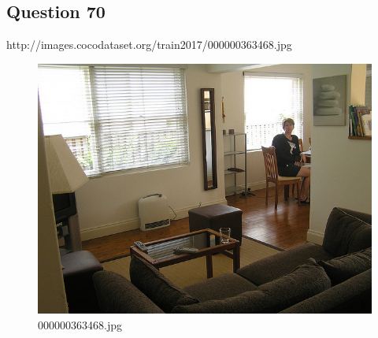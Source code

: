 \subsection*{Question 70}
http://images.cocodataset.org/train2017/000000363468.jpg
\begin{figure}[h]
    \centering
    \includegraphics[width=0.8\linewidth]{../image set/hard/000000363468.jpg}
    \caption{000000363468.jpg}
\end{figure}
